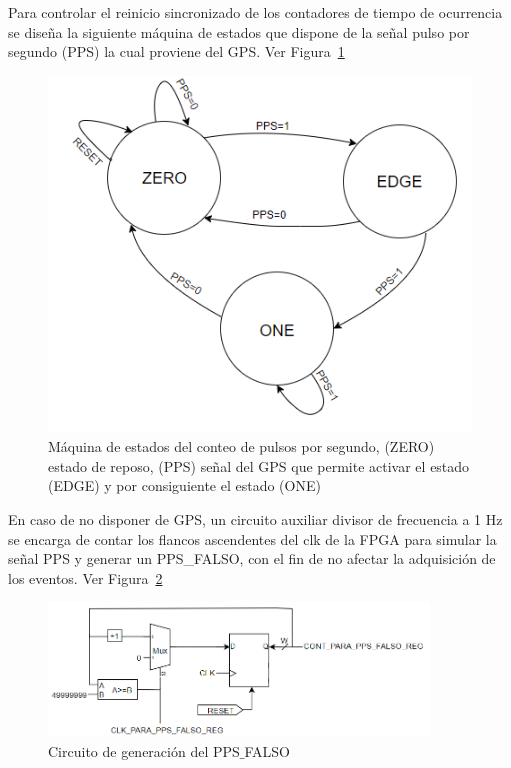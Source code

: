 Para controlar el reinicio sincronizado de los contadores de tiempo de ocurrencia se diseña la siguiente máquina de estados que dispone de la señal pulso por segundo (PPS) la cual proviene del GPS. Ver Figura~\ref{pps}
\begin{figure}[h!]
\includegraphics[scale=0.8]{Figs/MAQUINA1.PNG} 
\centering
\caption[Máquina de estados del conteo de pulsos por segundo]{Máquina de estados del conteo de pulsos por segundo, (ZERO) estado de reposo, (PPS) señal del GPS que permite activar el estado (EDGE) y por consiguiente el estado (ONE)}
\label{pps}
\end{figure}

En caso de no disponer de GPS, un circuito auxiliar divisor de frecuencia a 1 Hz se encarga de contar los flancos ascendentes del clk de la FPGA para simular la señal PPS y generar un PPS\_FALSO, con el fin de no afectar la adquisición de los eventos. Ver Figura~\ref{ppsfalso} 

\begin{figure}[H]
\includegraphics[width=0.9\textwidth]{Figs/CONPPSFALSO.PNG} 
\centering
\caption{Circuito de generación del PPS$\_$FALSO}
\label{ppsfalso}
\end{figure}

